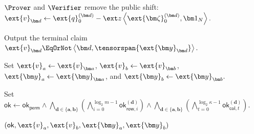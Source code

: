 \begin{algorithm}[!t]
{    \(\Prover\) and \(\Verifier\) remove the public shift:
    \(
        \ext{v}_{\bm d}
        \leftarrow
        \ext{q}^{(\bm d)}_0
        -
        \ext z
        \left\langle
            \ext{\bm\zeta}^{(\bm d)}_0,
            \bm 1_N
        \right\rangle.
    \)

    Output the terminal claim
    \(
        \ext{v}_{\bm d}
        \EqOrNot
        \left\langle
            \bm d,
            \tensorspan{\ext{\bm y}_{\bm d}}
        \right\rangle.
    \)
}

Set
\(
    \ext{v}_a\leftarrow\ext{v}_{\bm a}
\),
\(
    \ext{v}_b\leftarrow\ext{v}_{\bm b}
\),
\(
    \ext{\bm y}_a\leftarrow\ext{\bm y}_{\bm a}
\),
and
\(
    \ext{\bm y}_b\leftarrow\ext{\bm y}_{\bm b}.
\)

Set
\(
    \mathsf{ok}
    \leftarrow
    \mathsf{ok}_{\mathsf{perm}}
    \wedge
    \bigwedge_{\bm d\in\{\bm a,\bm b\}}
    \left(
        \bigwedge_{i=0}^{\log_2m-1}
        \mathsf{ok}^{(\bm d)}_{\mathsf{row},i}
    \right)
    \wedge
    \bigwedge_{\bm d\in\{\bm a,\bm b\}}
    \left(
        \bigwedge_{t=0}^{\log_2\kappa-1}
        \mathsf{ok}^{(\bm d)}_{\mathsf{col},t}
    \right).
\)

\Return
\(
    (
        \mathsf{ok},
        \ext{v}_a,
        \ext{v}_b,
        \ext{\bm y}_a,
        \ext{\bm y}_b
    )
\)\;
\end{algorithm}
